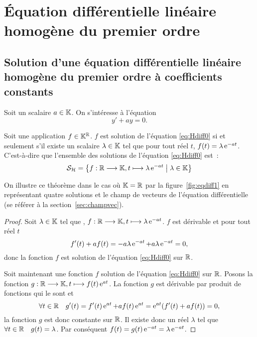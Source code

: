 \section{Équation différentielle linéaire homogène du premier ordre}
\label{sec:equadifflinhomog1}

\subsection[Solution équation homogène coefficients constants]{Solution d'une
  équation différentielle linéaire homogène du premier ordre à coefficients
constants}
\label{subsec:solutioneqdifflinhomog1coefconstants}

Soit un scalaire \(a \in \mathbb{K}\). On s'intéresse à l'équation
\begin{equation}
  \label{eq:Hdiff0}
  y' + ay = 0.
\end{equation}

\begin{theo}
  \label{theo:1}
  Soit une application \(f \in \mathbb{K}^{\mathbb{R}}\). \(f\) est solution de l'équation
  \eqref{eq:Hdiff0} si et seulement s'il existe un scalaire \(\lambda \in \mathbb{K}\)
  tel que pour tout réel \(t\), \(f(t) = \lambda \operatorname{e}^{-at}\). C'est-à-dire que
  l'ensemble des solutions de l'équation \eqref{eq:Hdiff0} est~:
  \begin{equation}
    \mathcal{S}_{\mathcal{H}} = \left\{f:\mathbb{R} \longrightarrow{} \mathbb{K}, t \longmapsto{} \lambda \operatorname{e}^{-at}\mathrel{}\middle|\mathrel{}\lambda \in
    \mathbb{K}\right\}
  \end{equation}
\end{theo}

On illustre ce théorème dans le cas où \(\mathbb{K} = \mathbb{R}\) par la
figure~\ref{fig:eqdiff1} en représentant quatre solutions et le champ de
vecteurs de l'équation différentielle (se référer à la
section~\ref{sec:champvec}).

\begin{proof}
  Soit \(\lambda \in \mathbb{K}\) tel que ,
  \(f:\mathbb{R} \longrightarrow{} \mathbb{K}, t \longmapsto{} \lambda\operatorname{e}^{-at}\). \(f\) est dérivable et pour
  tout réel \(t\)
  \begin{equation}
    f'(t) + af(t) = -a \lambda \operatorname{e}^{-at} + a \lambda \operatorname{e}^{-at} = 0,
  \end{equation}
  donc la fonction \(f\) est solution de l'équation \eqref{eq:Hdiff0} sur
  \(\mathbb{R}\).

  Soit maintenant une fonction \(f\) solution de l'équation \eqref{eq:Hdiff0}
  sur \(\mathbb{R}\). Posons la fonction \(g:\mathbb{R} \longrightarrow{} \mathbb{K}, t \longmapsto{} f(t)\operatorname{e}^{at}\). La
  fonction \(g\) est dérivable par produit de fonctions qui le sont et
  \begin{equation}
    \forall t \in \mathbb{R} \quad g'(t) = f'(t)\operatorname{e}^{at} + af(t)\operatorname{e}^{at} =
    \operatorname{e}^{at}(f'(t) + af(t)) = 0,
  \end{equation}
  la fonction \(g\) est donc constante sur \(\mathbb{R}\). Il existe donc un réel
  \(\lambda\) tel que \(\forall t \in \mathbb{R} \quad g(t) = \lambda\). Par conséquent
  \(f(t) = g(t)\operatorname{e}^{-at} = \lambda \operatorname{e}^{-at}\).
\end{proof}

